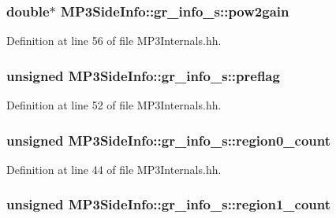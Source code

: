 \subsubsection[{pow2gain}]{\setlength{\rightskip}{0pt plus 5cm}double$\ast$ M\+P3\+Side\+Info\+::gr\+\_\+info\+\_\+s\+::pow2gain}\label{structMP3SideInfo_1_1gr__info__s_a426c1293b4df47462a4ca3ec829660e1}


Definition at line 56 of file M\+P3\+Internals.\+hh.

\subsubsection[{preflag}]{\setlength{\rightskip}{0pt plus 5cm}unsigned M\+P3\+Side\+Info\+::gr\+\_\+info\+\_\+s\+::preflag}\label{structMP3SideInfo_1_1gr__info__s_ae2a062645c9091492aecfe422c9ba395}


Definition at line 52 of file M\+P3\+Internals.\+hh.

\subsubsection[{region0\+\_\+count}]{\setlength{\rightskip}{0pt plus 5cm}unsigned M\+P3\+Side\+Info\+::gr\+\_\+info\+\_\+s\+::region0\+\_\+count}\label{structMP3SideInfo_1_1gr__info__s_ac25b5216f5fd2559eeec4758c107f239}


Definition at line 44 of file M\+P3\+Internals.\+hh.

\subsubsection[{region1\+\_\+count}]{\setlength{\rightskip}{0pt plus 5cm}unsigned M\+P3\+Side\+Info\+::gr\+\_\+info\+\_\+s\+::region1\+\_\+count}\label{structMP3SideInfo_1_1gr__info__s_a99b72d700470964de26e7a0ad3b7df59}


